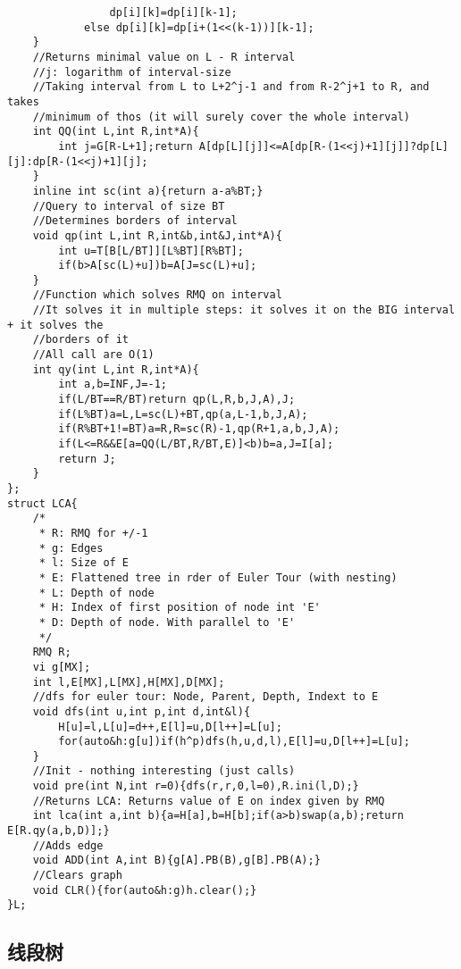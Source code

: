 \begin{lstlisting}
                dp[i][k]=dp[i][k-1];
            else dp[i][k]=dp[i+(1<<(k-1))][k-1];
    }
    //Returns minimal value on L - R interval
    //j: logarithm of interval-size
    //Taking interval from L to L+2^j-1 and from R-2^j+1 to R, and takes
    //minimum of thos (it will surely cover the whole interval)
    int QQ(int L,int R,int*A){
        int j=G[R-L+1];return A[dp[L][j]]<=A[dp[R-(1<<j)+1][j]]?dp[L][j]:dp[R-(1<<j)+1][j];
    }
    inline int sc(int a){return a-a%BT;}
    //Query to interval of size BT
    //Determines borders of interval
    void qp(int L,int R,int&b,int&J,int*A){
        int u=T[B[L/BT]][L%BT][R%BT];
        if(b>A[sc(L)+u])b=A[J=sc(L)+u];
    }
    //Function which solves RMQ on interval
    //It solves it in multiple steps: it solves it on the BIG interval + it solves the
    //borders of it
    //All call are O(1)
    int qy(int L,int R,int*A){
        int a,b=INF,J=-1;
        if(L/BT==R/BT)return qp(L,R,b,J,A),J;
        if(L%BT)a=L,L=sc(L)+BT,qp(a,L-1,b,J,A);
        if(R%BT+1!=BT)a=R,R=sc(R)-1,qp(R+1,a,b,J,A);
        if(L<=R&&E[a=QQ(L/BT,R/BT,E)]<b)b=a,J=I[a];
        return J;
    }
};
struct LCA{
    /*
     * R: RMQ for +/-1
     * g: Edges
     * l: Size of E
     * E: Flattened tree in rder of Euler Tour (with nesting)
     * L: Depth of node
     * H: Index of first position of node int 'E'
     * D: Depth of node. With parallel to 'E'
     */
    RMQ R;
    vi g[MX];
    int l,E[MX],L[MX],H[MX],D[MX];
    //dfs for euler tour: Node, Parent, Depth, Indext to E
    void dfs(int u,int p,int d,int&l){
        H[u]=l,L[u]=d++,E[l]=u,D[l++]=L[u];
        for(auto&h:g[u])if(h^p)dfs(h,u,d,l),E[l]=u,D[l++]=L[u];
    }
    //Init - nothing interesting (just calls)
    void pre(int N,int r=0){dfs(r,r,0,l=0),R.ini(l,D);}
    //Returns LCA: Returns value of E on index given by RMQ
    int lca(int a,int b){a=H[a],b=H[b];if(a>b)swap(a,b);return E[R.qy(a,b,D)];}
    //Adds edge
    void ADD(int A,int B){g[A].PB(B),g[B].PB(A);}
    //Clears graph
    void CLR(){for(auto&h:g)h.clear();}
}L;
\end{lstlisting}


\subsection{线段树}

